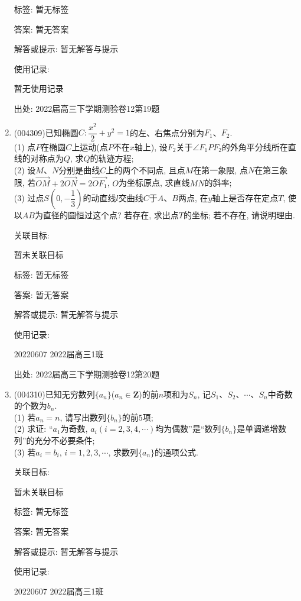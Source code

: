 \documentclass[10pt,a4paper]{article}
\begin{document}
\begin{enumerate}[1.]
标签: 暂无标签

答案: 暂无答案

解答或提示: 暂无解答与提示

使用记录:

暂无使用记录


出处: 2022届高三下学期测验卷12第19题
\item { (004309)}已知椭圆$C:\dfrac{x^2}2+y^2=1$的左、右焦点分别为$F_1$、$F_2$.\\
(1) 点$P$在椭圆$C$上运动(点$P$不在$x$轴上), 设$F_2$关于$\angle F_1PF_2$的外角平分线所在直线的对称点为$Q$, 求$Q$的轨迹方程;\\
(2) 设$M$、$N$分别是曲线$C$上的两个不同点, 且点$M$在第一象限, 点$N$在第三象限, 若$\overrightarrow{OM}+2\overrightarrow{ON}=2\overrightarrow{OF_1}$, $O$为坐标原点, 求直线$MN$的斜率;\\
(3) 过点$S(0,-\dfrac 13)$的动直线$l$交曲线$C$于$A$、$B$两点, 在$y$轴上是否存在定点$T$, 使以$AB$为直径的圆恒过这个点? 若存在, 求出点$T$的坐标; 若不存在, 请说明理由.


关联目标:

暂未关联目标



标签: 暂无标签

答案: 暂无答案

解答或提示: 暂无解答与提示

使用记录:

20220607	2022届高三1班	


出处: 2022届高三下学期测验卷12第20题
\item { (004310)}已知无穷数列$\{a_n\}$($a_n\in \mathbf{Z}$)的前$n$项和为$S_n$, 记$S_1$、$S_2$、$\cdots$、$S_n$中奇数的个数为$b_n$.\\
(1) 若$a_n=n$, 请写出数列$\{b_n\}$的前$5$项;\\
(2) 求证: ``$a_1$为奇数, $a_i(i=2,3,4,\cdots)$均为偶数''是``数列$\{b_n\}$是单调递增数列''的充分不必要条件;\\
(3) 若$a_i=b_i$, $i=1,2,3,\cdots$, 求数列$\{a_n\}$的通项公式.


关联目标:

暂未关联目标



标签: 暂无标签

答案: 暂无答案

解答或提示: 暂无解答与提示

使用记录:

20220607	2022届高三1班			



\end{enumerate}
\end{document}

